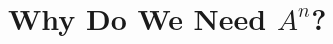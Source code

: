 \documentclass[10pt]{beamer}
\theoremstyle{definition}
\begin{document}
\section{Why Do We Need $A^n$?}
\end{document}
